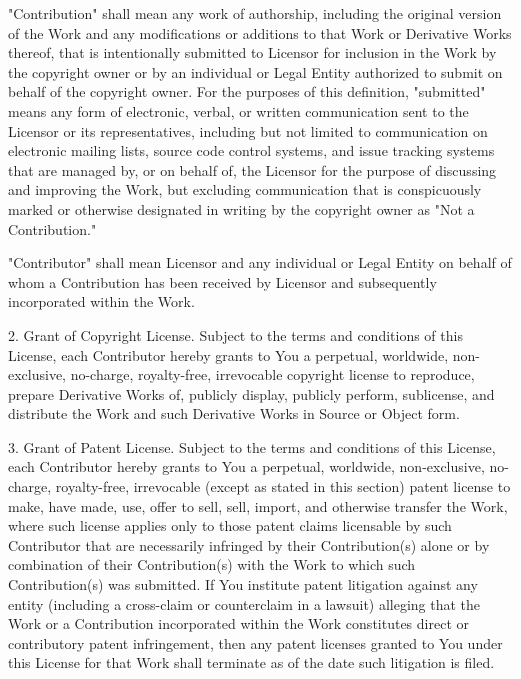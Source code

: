 \documentclass[parskip=half]{scrartcl}
\begin{document}
      "Contribution" shall mean any work of authorship, including
      the original version of the Work and any modifications or additions
      to that Work or Derivative Works thereof, that is intentionally
      submitted to Licensor for inclusion in the Work by the copyright owner
      or by an individual or Legal Entity authorized to submit on behalf of
      the copyright owner. For the purposes of this definition, "submitted"
      means any form of electronic, verbal, or written communication sent
      to the Licensor or its representatives, including but not limited to
      communication on electronic mailing lists, source code control systems,
      and issue tracking systems that are managed by, or on behalf of, the
      Licensor for the purpose of discussing and improving the Work, but
      excluding communication that is conspicuously marked or otherwise
      designated in writing by the copyright owner as "Not a Contribution."

      "Contributor" shall mean Licensor and any individual or Legal Entity
      on behalf of whom a Contribution has been received by Licensor and
      subsequently incorporated within the Work.

   2. Grant of Copyright License. Subject to the terms and conditions of
      this License, each Contributor hereby grants to You a perpetual,
      worldwide, non-exclusive, no-charge, royalty-free, irrevocable
      copyright license to reproduce, prepare Derivative Works of,
      publicly display, publicly perform, sublicense, and distribute the
      Work and such Derivative Works in Source or Object form.

   3. Grant of Patent License. Subject to the terms and conditions of
      this License, each Contributor hereby grants to You a perpetual,
      worldwide, non-exclusive, no-charge, royalty-free, irrevocable
      (except as stated in this section) patent license to make, have made,
      use, offer to sell, sell, import, and otherwise transfer the Work,
      where such license applies only to those patent claims licensable
      by such Contributor that are necessarily infringed by their
      Contribution(s) alone or by combination of their Contribution(s)
      with the Work to which such Contribution(s) was submitted. If You
      institute patent litigation against any entity (including a
      cross-claim or counterclaim in a lawsuit) alleging that the Work
      or a Contribution incorporated within the Work constitutes direct
      or contributory patent infringement, then any patent licenses
      granted to You under this License for that Work shall terminate
      as of the date such litigation is filed.
\end{document}
